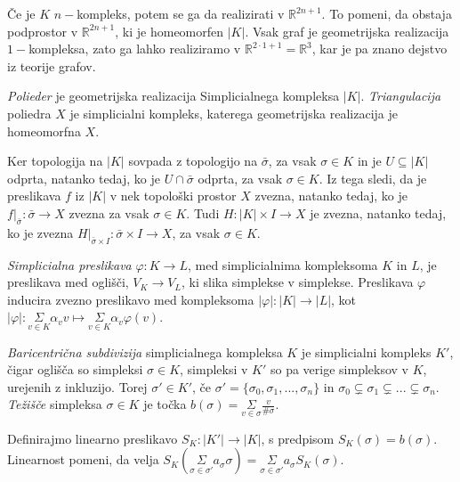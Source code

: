\documentclass[mat1]{fmfdelo}
\DeclareRobustCommand{\si}{
    \bar{\sigma}}
\newcommand{\R}{\mathbb R}
\begin{document}
 \begin{opomba}
     Če je $K$ $n-$kompleks, potem se ga da realizirati v $\R^{2n+1}$. To pomeni, da obstaja podprostor v
     $\R^{2n+1}$, ki je homeomorfen $|K|$. Vsak graf je geometrijska realizacija $1-$kompleksa, zato ga 
     lahko realiziramo v $\R^{2\cdot 1 +1}=\R^{3}$, kar je pa znano dejstvo iz teorije grafov.
 \end{opomba}
 
 
 \textit{Polieder} je geometrijska realizacija Simplicialnega kompleksa $|K|$. \textit{Triangulacija} poliedra $X$ je simplicialni kompleks, katerega geometrijska realizacija je homeomorfna $X$.
 
 Ker topologija na $|K|$ sovpada z topologijo na $\bar{\sigma}$, za vsak $\sigma\in K$ in je $U \subseteq |K|$ odprta, natanko tedaj, ko je $U \cap 
 \si$ odprta, za vsak $\sigma \in K$. Iz tega sledi, da je preslikava $f$ iz $|K|$ v nek topološki prostor $X$ zvezna, natanko tedaj, ko je $f|_{\bar{\sigma}}: \bar{\sigma} \rightarrow X$ zvezna za vsak $\sigma\in K$. Tudi $H:|K|\times I \rightarrow X$ je zvezna, natanko tedaj, ko je zvezna $H|_{\si\times I}:\si\times I \rightarrow X$, za vsak $\sigma\in K$.
 
 
 \textit{Simplicialna preslikava} $\varphi :K \rightarrow L$, med 
 simplicialnima kompleksoma $K$ in $L$, je preslikava med 
 oglišči, $V_K \rightarrow V_L$, ki slika simplekse v 
 simplekse. Preslikava $\varphi$ inducira zvezno preslikavo med 
 kompleksoma $|\varphi| :|K| \rightarrow |L|$, kot $|\varphi|:
 \underset{v \in K}{\Sigma}\alpha_v v \mapsto
 \underset{v \in K}{\Sigma}\alpha_v \varphi(v)$.
 
     
 \textit{Baricentrična subdivizija} simplicialnega kompleksa 
 $K$ je simplicialni kompleks $K'$, čigar oglišča so 
 simpleksi $\sigma \in K$, simpleksi v $K'$ so pa verige 
 simpleksov v $K$, urejenih z inkluzijo. Torej $\sigma' \in K'$, če $\sigma' = \{\sigma_0, \sigma_1,...,\sigma_n\}$ in $\sigma_0\subsetneq \sigma_1\subsetneq...\subsetneq\sigma_n$. \textit{Težišče} simpleksa $\sigma \in K$ je točka $b(\sigma)=\underset{v\in \sigma}{\Sigma} \frac{v}{\#\sigma}$.
 
 Definirajmo linearno preslikavo $S_K: |K'| \rightarrow |K|$, s predpisom $S_K(\sigma) = b(\sigma)$. Linearnost pomeni, da velja $S_K(\underset{\sigma\in \sigma'}{\Sigma} a_\sigma \sigma) =  \underset{\sigma\in \sigma'}{\Sigma} a_\sigma S_K(\sigma).$
 
\end{document}

